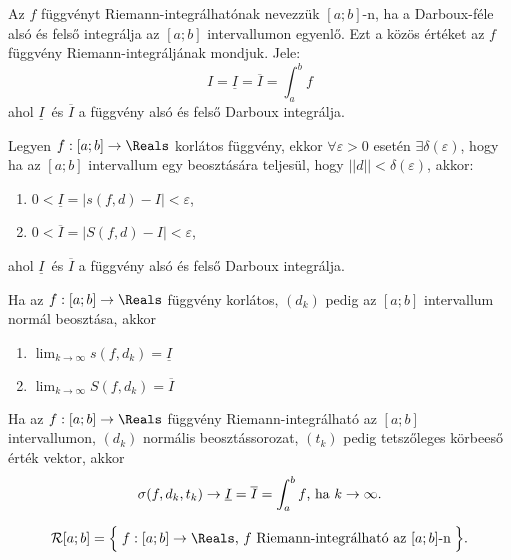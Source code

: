 \begin{definition}
  Az $f$ függvényt Riemann-integrálhatónak nevezzük $[a; b]$-n, ha a
  Darboux-féle alsó és felső integrálja az $[a; b]$ intervallumon egyenlő. Ezt a
  közös értéket az $f$ függvény Riemann-integráljának mondjuk. Jele:
  \[
    I
    = \underline I
    = \overline I
    = \int_{a}^{b} f
  \]
  ahol $\underline I$ és $\overline I$ a függvény alsó és felső Darboux
  integrálja.
\end{definition}

\begin{theorem}
  Legyen $f: [a;b] \rightarrow \Reals$ korlátos függvény, ekkor $\forall
    \varepsilon > 0$ esetén $\exists \delta(\varepsilon)$, hogy ha az $[a; b]$
  intervallum egy beosztására teljesül, hogy $||d|| < \delta(\varepsilon)$,
  akkor:
  \begin{enumerate}
    \item $0 < \underline I = |s(f, d) - I| < \varepsilon$,
    \item $0 < \overline I = |S(f, d) - I| < \varepsilon$,
  \end{enumerate}
  ahol $\underline I$ és $\overline I$ a függvény alsó és felső Darboux
  integrálja.
\end{theorem}

\begin{note}
  Ha az $f: [a;b] \rightarrow \Reals$ függvény korlátos, $(d_k)$ pedig az
  $[a; b]$ intervallum normál beosztása, akkor
  \begin{enumerate}
    \item $\displaystyle \lim_{k \rightarrow \infty} s(f, d_k) = \underline I$
    \item $\displaystyle \lim_{k \rightarrow \infty} S(f, d_k) = \overline I$
  \end{enumerate}
\end{note}

\begin{note}
  Ha az $f: [a;b] \rightarrow \Reals$ függvény Riemann-integrálható az
  $[a;b]$ intervallumon, $(d_k)$ normális beosztássorozat, $(t_k)$ pedig
  tetszőleges körbeeső érték vektor, akkor
  \[
    \sigma(f, d_k, t_k) \rightarrow
    \underline I =
    \overline I =
    \int_{a}^{b} f
    \text{, ha }
    k \rightarrow \infty
    \text.
  \]
\end{note}

\begin{note}
  \[
    \mathcal R [a; b] = \Big\{\;
    f: [a;b] \rightarrow \Reals
    \text{, }
    f
    \text{ Riemann-integrálható az }
    [a; b]
    \text{-n}
    \;\Big\}
    \text.
  \]
\end{note}



